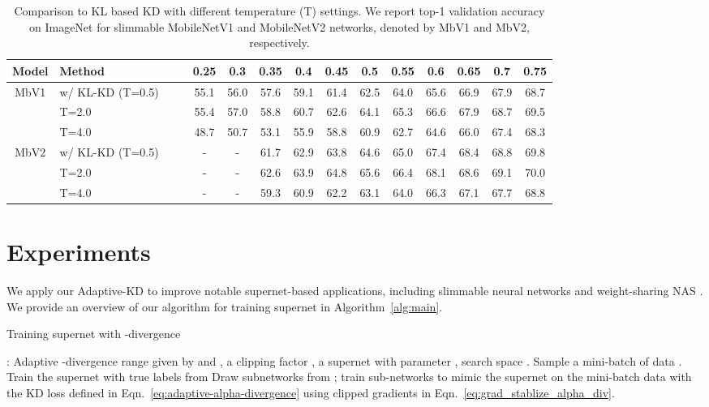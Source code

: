 \documentclass{article}
\begin{document}
\begin{table*}[ht]
\centering
\setlength{\tabcolsep}{4pt}
\begin{tabular}{c|l|ccccccccccc}
\hline
Model & Method & 0.25 &  0.3  &  0.35  &  0.4  &  0.45  &  0.5  &  0.55   &  0.6  & 0.65 & 0.7 & 0.75\\
\hline \hline 
\multirow{3}{*}{MbV1} & w/ KL-KD (T=0.5)~~~~
& 55.1  & 56.0 & 57.6& 59.1  & 61.4 & 62.5  & 64.0 & 65.6  & 66.9  & 67.9  & 68.7  \\
& T=2.0 & 55.4& 57.0 & 58.8 & 60.7 & 62.6 & 64.1& 65.3 & 66.6  & 67.9 & 68.7& 69.5\\
&  T=4.0 & 48.7  & 50.7  & 53.1 & 55.9  & 58.8 & 60.9& 62.7 & 64.6 & 66.0 & 67.4 & 68.3\\
\hline \hline 
\multirow{3}{*}{MbV2} & w/ KL-KD (T=0.5)~~~& - & - &  61.7 & 62.9 & 63.8 & 64.6 & 65.0 & 67.4 & 68.4 & 68.8 & 69.8  \\
 & T=2.0 & - & - & 62.6 & 63.9 & 64.8 & 65.6 & 66.4 & 68.1 & 68.6 & 69.1 & 70.0 \\ 
 & T=4.0 & - & - & 59.3 & 60.9 & 62.2 & 63.1 & 64.0 & 66.3 & 67.1 & 67.7 & 68.8 \\ \hline 
\end{tabular}
\caption{Comparison to KL based KD with different temperature (T) settings.  
We report top-1 validation accuracy on ImageNet for slimmable MobileNetV1 and MobileNetV2  networks, denoted by MbV1 and MbV2, respectively.}
\label{tab:slimmable_abalation}
\end{table*}

\section{Experiments}
We apply our Adaptive-KD to improve notable supernet-based applications, including  slimmable neural networks \citep{yu2019universally}
and weight-sharing NAS  \citep[e.g.,][]{cai2019once, yu2020bignas, wang2020attentivenas}. 
We provide an overview of our algorithm for training supernet in Algorithm~\ref{alg:main}.

\begin{algorithm}[t]
\caption{Training supernet with -divergence}
\label{alg:main}
\begin{algorithmic}[1]
: Adaptive -divergence range given by  and , a clipping factor , a supernet with parameter , search space .
\STATE Sample a mini-batch of data .
\STATE Train the supernet with true labels from 
\STATE Draw  subnetworks  from ; train sub-networks to mimic the supernet on the mini-batch data  with the KD loss defined in Eqn.~\eqref{eq:adaptive-alpha-divergence} using clipped gradients in Eqn.~\eqref{eq:grad_stablize_alpha_div}.
\ENDWHILE
\end{algorithmic}
\end{algorithm}
\end{document}
